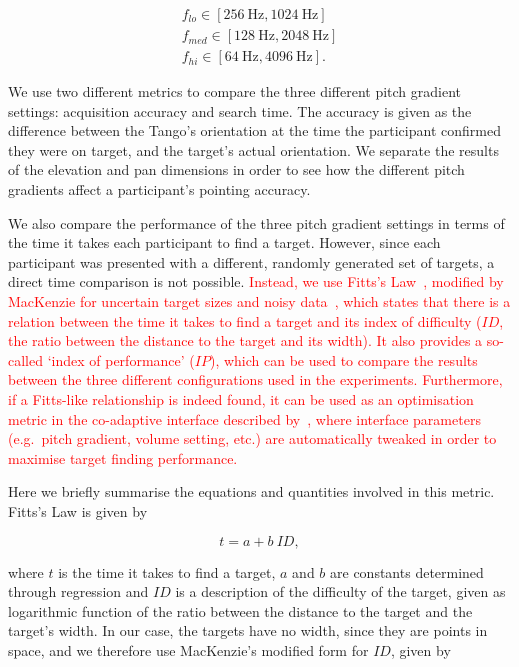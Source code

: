 \documentclass[acmsmall]{acmart}
\newcommand\hl[1]{\textcolor{red}{#1}}
\begin{document}
\begin{gather*}
  f_{lo}\in[\SI{256}{\hertz}, \SI{1024}{\hertz}]\\
  f_{med}\in[\SI{128}{\hertz}, \SI{2048}{\hertz}]\\
  f_{hi}\in[\SI{64}{\hertz}, \SI{4096}{\hertz}].
\end{gather*}

We use two different metrics to compare the three different pitch gradient settings: acquisition accuracy and search time.
The accuracy is given as the difference between the Tango's orientation at the time the participant confirmed they were on target, and the target's actual orientation.
We separate the results of the elevation and pan dimensions in order to see how the different pitch gradients affect a participant's pointing accuracy. 

We also compare the performance of the three pitch gradient settings in terms of the time it takes each participant to find a target.
However, since each participant was presented with a different, randomly generated set of targets, a direct time comparison is not possible.
\hl{Instead, we use Fitts's Law~\citep{fitts1954information}, modified by MacKenzie for uncertain target sizes and noisy data~\citep{mackenzie1992fitts}, which states that there is a relation between the time it takes to find a target and its index of difficulty ($ID$, the ratio between the distance to the target and its width).
It also provides a so-called `index of performance' ($IP$), which can be used to compare the results between the three different configurations used in the experiments.
Furthermore, if a Fitts-like relationship is indeed found, it can be used as an optimisation metric in the co-adaptive interface described by~\cite{lock2017portable}, where interface parameters (e.g.\ pitch gradient, volume setting, etc.) are automatically tweaked in order to maximise target finding performance.}

Here we briefly summarise the equations and quantities involved in this metric.
Fitts's Law is given by  

\begin{equation}
  \label{eq:fitts-base}
  t = a + b~ID,
\end{equation}

\noindent
where $t$ is the time it takes to find a target, $a$ and $b$ are constants determined through regression and $ID$ is a description of the difficulty of the target, given as logarithmic function of the ratio between the distance to the target and the target's width.
In our case, the targets have no width, since they are points in space, and we therefore use MacKenzie's modified form for $ID$, given by
\end{document}
